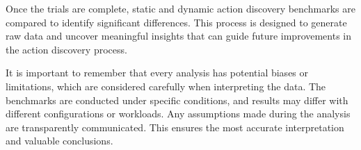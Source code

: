 Once the trials are complete, static and dynamic action discovery benchmarks are compared to identify significant differences. This process is designed to generate raw data and uncover meaningful insights that can guide future improvements in the action discovery process.

It is important to remember that every analysis has potential biases or limitations, which are considered carefully when interpreting the data. The benchmarks are conducted under specific conditions, and results may differ with different configurations or workloads. Any assumptions made during the analysis are transparently communicated. This ensures the most accurate interpretation and valuable conclusions.
